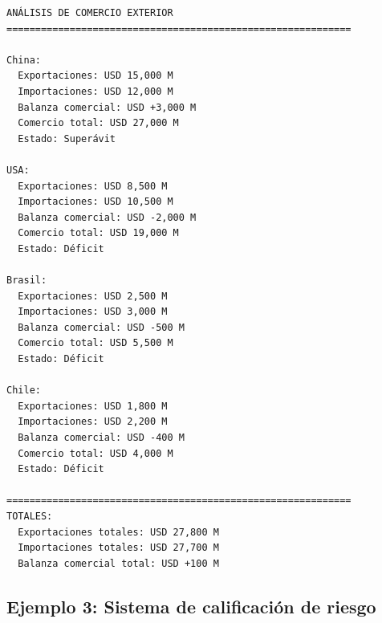 \documentclass[
  doc,
  floatsintext,
  longtable,
  a4paper,
  nolmodern,
  notxfonts,
  notimes,
  12pt,
  colorlinks=true,linkcolor=blue,citecolor=blue,urlcolor=blue]{apa7}
\begin{document}
\begin{verbatim}
ANÁLISIS DE COMERCIO EXTERIOR
============================================================

China:
  Exportaciones: USD 15,000 M
  Importaciones: USD 12,000 M
  Balanza comercial: USD +3,000 M
  Comercio total: USD 27,000 M
  Estado: Superávit

USA:
  Exportaciones: USD 8,500 M
  Importaciones: USD 10,500 M
  Balanza comercial: USD -2,000 M
  Comercio total: USD 19,000 M
  Estado: Déficit

Brasil:
  Exportaciones: USD 2,500 M
  Importaciones: USD 3,000 M
  Balanza comercial: USD -500 M
  Comercio total: USD 5,500 M
  Estado: Déficit

Chile:
  Exportaciones: USD 1,800 M
  Importaciones: USD 2,200 M
  Balanza comercial: USD -400 M
  Comercio total: USD 4,000 M
  Estado: Déficit

============================================================
TOTALES:
  Exportaciones totales: USD 27,800 M
  Importaciones totales: USD 27,700 M
  Balanza comercial total: USD +100 M
\end{verbatim}

\subsection{Ejemplo 3: Sistema de calificación de
riesgo}\label{ejemplo-3-sistema-de-calificaciuxf3n-de-riesgo}
\end{document}
